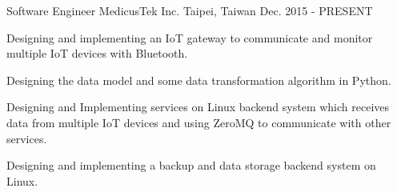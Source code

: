 

\begin{cventries}

  \cventry
    {Software Engineer} %
    {MedicusTek Inc.} %
    {Taipei, Taiwan} %
    {Dec. 2015 - PRESENT} %
    {
      \begin{cvitems} %
        \item {Designing and implementing an IoT gateway to communicate and monitor multiple IoT devices with Bluetooth.}
        \item {Designing the data model and some data transformation algorithm in Python.}
        \item {Designing and Implementing services on Linux backend system which receives data from multiple IoT devices and using ZeroMQ to communicate with other services.}
        \item {Designing and implementing a backup and data storage backend system on Linux.}
      \end{cvitems}
    }

\end{cventries}
